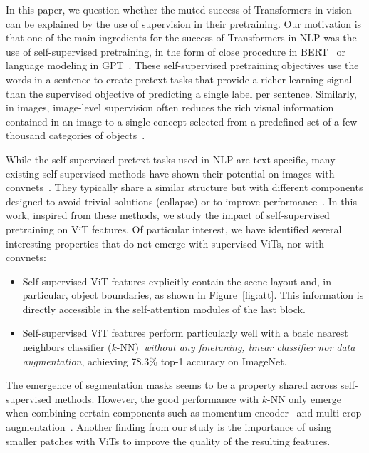 In this paper, we question whether the muted success of Transformers in vision can be explained by the use of supervision in their pretraining. Our motivation is that one of the main ingredients for the success of Transformers in NLP was the use of self-supervised pretraining, in the form of close procedure in BERT~\cite{devlin2018bert} or language modeling in GPT~\cite{radford2019language}. These self-supervised pretraining objectives use the words in a sentence to create pretext tasks that provide a richer learning signal than the supervised objective of predicting a single label per sentence. Similarly, in images, image-level supervision often reduces the rich visual information contained in an image to a single concept selected from a predefined set of a few thousand categories of objects~\cite{russakovsky2015imagenet}.

While the self-supervised pretext tasks used in NLP are text specific, many existing self-supervised methods have shown their potential on images with convnets~\cite{caron2020unsupervised, chen2020simple,grill2020bootstrap,he2020momentum}. They typically share a similar structure but with different components designed to avoid trivial solutions (collapse) or to improve performance~\cite{chen2020exploring}. In this work, inspired from these methods, we study the impact of self-supervised pretraining on ViT features. Of particular interest, we have identified several interesting properties that do not emerge with supervised ViTs, nor with convnets:

\begin{itemize}
\item
Self-supervised ViT features explicitly contain the scene layout and, in particular, object boundaries, as shown in Figure~\ref{fig:att}.
This information is directly accessible in the self-attention modules of the last block.
\item
Self-supervised ViT features perform particularly well with a basic nearest neighbors classifier ($k$-NN)~\emph{without any finetuning, linear classifier nor data augmentation}, achieving 78.3\% top-1 accuracy on ImageNet.

\end{itemize}

The emergence of segmentation masks seems to be a property shared across self-supervised methods. However, the good performance with $k$-NN only emerge when combining certain components such as momentum encoder~\cite{he2020momentum} and multi-crop augmentation~\cite{caron2020unsupervised}. Another finding from our study is the importance of using smaller patches with ViTs to improve the quality of the resulting features. 

